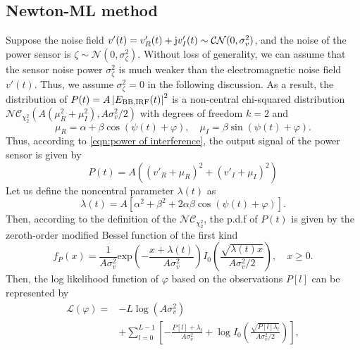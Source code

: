 \documentclass[conference,10pt,twocolumn]{IEEEtran}
\theoremstyle{nonumberplain}
\def \exp {\text{exp}}
\def \nc {\mathcal{NC}}
\begin{document}
\subsection{Newton-ML method}  \label{ML method}
    Suppose the noise field $v'(t)=v'_R(t) + {\rm j}v'_I(t)\sim \mathcal{CN}(0, \sigma_v^2)$, and the noise of the power sensor is $\zeta \sim \mathcal{N}(0, \sigma_{\zeta}^2)$. 
    Without loss of generality, we can assume that the sensor noise power $\sigma_{\zeta}^2$ is much weaker than the electromagnetic noise field $v'(t)$.
    Thus, we assume $\sigma_{\zeta}^2=0$ in the following discussion.  
    As a result, the distribution of $P(t) = A\left|E_{{\rm BB}, {\rm IRF}}(t)\right|^2$ is a non-central chi-squared distribution $\nc_{\chi_2^2}(A(\mu_{R}^2+\mu_{I}^2),  A\sigma_v^2/2)$ with degrees of freedom $k=2$ and
    \begin{equation}
        \mu_{R} = \alpha + \beta \cos(\psi(t)+\varphi),\quad  \mu_{I}  = \beta \sin(\psi(t)+\varphi).
        \label{chi2 distribution mean values}
    \end{equation}
    Thus, according to \eqref{eqn:power of interference}, the output signal of the power sensor is given by 
    \begin{equation}
        P(t)  = A\left((v'_{R} + \mu_{R})^2 + (v'_{I} + \mu_{I})^2 \right)
        \label{eqn:sensor power}
    \end{equation}
    Let us define the noncentral parameter $\lambda(t)$ as
    \begin{equation}
        \lambda(t)  = A\left[\alpha^{2}+\beta^{2}+2\alpha\beta\cos\left(\psi(t)+\varphi\right)\right].
    \end{equation}
    Then, according to the definition of the $\nc_{\chi_2^2}$, the p.d.f of $P(t)$ is given by the zeroth-order modified Bessel function of the first kind 
    \begin{equation}
        f_{P}(x) = \frac{1}{A\sigma_{v}^2} \exp\left(-\frac{x+\lambda(t)}{A\sigma_v^2}\right)I_{0}\left(\frac{\sqrt{\lambda(t) x}}{A\sigma_v^2/2}\right),\quad x \geq 0.
        \label{ML single observation}
    \end{equation}
    Then, the log likelihood function of $\varphi$ based on the observations $P[l]$ can be represented by
    \begin{equation}
        \begin{aligned}
         \mathcal{L}(\varphi) =&- L\log(A\sigma_v^2)\\
        & +\sum_{l=0}^{L-1}\left[-\frac{P[l] + \lambda_l}{A\sigma_v^2} + \log I_0\left(\frac{\sqrt{P[l] \lambda_l}}{A\sigma_v^2/2}\right)\right],
        \end{aligned}
        \label{ML likelihood}
    \end{equation}
\end{document}
